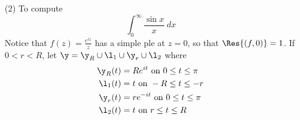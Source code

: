 \begin{example}
\begin{enumerate}
   \item[(2)] To compute
       \begin{equation*}
           \int_0^\infty{\frac{\sin{x}}{x} \ dx}
       \end{equation*}
       Notice that $f(z)=\frac{e^{iz}}{z}$ has a simple ple at $z=0$, so that
       $\Res{(f,0)}=1$. If $0<r<R$, let  $\y=\y_R \cup \l_1 \cup \y_r \cup \l_2$
       where
       \begin{align*}
           \y_R(t) &=   Re^{it} \text{ on } 0 \leq t \leq \pi   \\
           \l_1(t)  &=  t \text{ on } -R \leq t \leq -r \\
           \y_r(t)  &=  re^{-it} \text{ on } 0 \leq t \leq \pi  \\
           \l_2(t)  &=  t   \text{ on } r \leq t \leq R \\
       \end{align*}


\end{enumerate}
\end{example}
